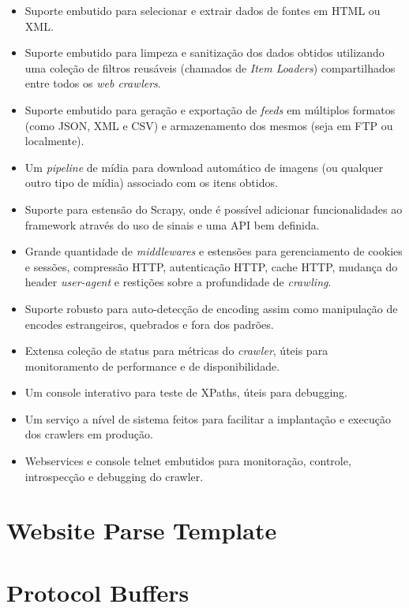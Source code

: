 \begin{itemize}
	\item Suporte embutido para selecionar e extrair dados de fontes em HTML ou XML.
	\item Suporte embutido para limpeza e sanitização dos dados obtidos utilizando uma coleção de filtros reusáveis (chamados de \emph{Item Loaders}) compartilhados entre todos os \emph{web crawlers}.
	\item Suporte embutido para geração e exportação de \emph{feeds} em múltiplos formatos (como JSON, XML e CSV) e armazenamento dos mesmos (seja em FTP ou localmente).
	\item Um \emph{pipeline} de mídia para download automático de imagens (ou qualquer outro tipo de mídia) associado com os itens obtidos.
	\item Suporte para estensão do Scrapy, onde é possível adicionar funcionalidades ao framework através do uso de sinais e uma API bem definida.
	\item Grande quantidade de \emph{middlewares} e estensões para gerenciamento de cookies e sessões, compressão HTTP, autenticação HTTP, cache HTTP, mudança do header \emph{user-agent} e restições sobre a profundidade de \emph{crawling}.
	\item Suporte robusto para auto-detecção de encoding assim como manipulação de encodes estrangeiros, quebrados e fora dos padrões.
	\item Extensa coleção de status para métricas do \emph{crawler}, úteis para monitoramento de performance e de disponibilidade.
	\item Um console interativo para teste de XPaths, úteis para debugging.
	\item Um serviço a nível de sistema feitos para facilitar a implantação e execução dos crawlers em produção.
	\item Webservices e console telnet embutidos para monitoração, controle, introspecção e debugging do crawler.
\end{itemize}

\pagebreak
\section{Website Parse Template}

\pagebreak
\section{Protocol Buffers}
